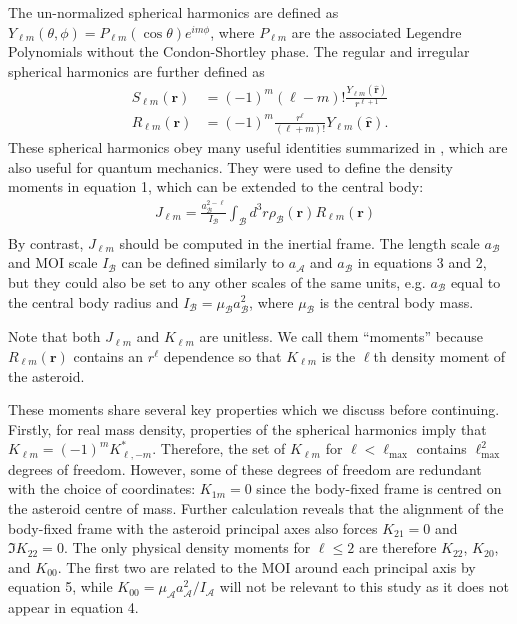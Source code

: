 \documentclass[9pt,twocolumn]{article}
\newcommand{\unit}[1]{\bm{\hat{#1}}}
\numberwithin{equation}{section}
\begin{document}
The un-normalized spherical harmonics are defined as $Y_{\ell m}(\theta, \phi) = P_{\ell m}(\cos \theta)e^{im\phi}$, where $P_{\ell m}$ are the associated Legendre Polynomials without the Condon-Shortley phase. The regular and irregular spherical harmonics are further defined as
\begin{equation}
  \begin{split}
    S_{\ell m}(\bm r) &= (-1)^m (\ell - m)! \frac{Y_{\ell m}(\unit r)}{r^{\ell+1}} \\
    R_{\ell m} (\bm r) &= (-1)^m \frac{r^\ell}{(\ell + m)!} Y_{\ell m}(\unit r).
  \end{split}
\end{equation}
These spherical harmonics obey many useful identities summarized in \cite{Gelderen1998TheSO}, which are also useful for quantum mechanics. They were used to define the density moments in equation 1, which can be extended to the central body:
\begin{equation}
  \begin{split}
    &J_{\ell m} = \frac{a_\mathcal{B}^{2-\ell}}{I_\mathcal{B}} \int_\mathcal{B} d^3 r \rho_\mathcal{B}(\bm r) R_{\ell m}(\bm r)\\
  \end{split}
  \label{eqn:jlm}
\end{equation}
By contrast, $J_{\ell m}$ should be computed in the inertial frame. The length scale $a_\mathcal{B}$ and MOI scale $I_\mathcal{B}$ can be defined similarly to $a_\mathcal{A}$ and $a_\mathcal{B}$ in equations 3 and 2, but they could also be set to any other scales of the same units, e.g. $a_\mathcal{B}$ equal to the central body radius and $I_\mathcal{B} = \mu_\mathcal{B}a_\mathcal{B}^2$, where $\mu_\mathcal{B}$ is the central body mass.

Note that both $J_{\ell m}$ and $K_{\ell m}$ are unitless. We call them ``moments'' because $R_{\ell m}(\bm r)$ contains an $r^\ell$ dependence so that $K_{\ell m}$ is the $\ell$th density moment of the asteroid.

These moments share several key properties which we discuss before continuing. Firstly, for real mass density, properties of the spherical harmonics imply that $K_{\ell m} = (-1)^m K_{\ell, -m}^*$. Therefore, the set of $K_{\ell m}$ for $\ell < \ell_\text{max}$ contains $\ell_\text{max}^2$ degrees of freedom. However, some of these degrees of freedom are redundant with the choice of coordinates: $K_{1m} = 0$ since the body-fixed frame is centred on the asteroid centre of mass. Further calculation reveals that the alignment of the body-fixed frame with the asteroid principal axes also forces $K_{21}= 0$ and $\Im K_{22}=0$. The only physical density moments for $\ell \leq 2$ are therefore $K_{22}$, $K_{20}$, and $K_{00}$. The first two are related to the MOI around each principal axis by equation 5, while $K_{00} = \mu_\mathcal{A} a_\mathcal{A}^2 / I_\mathcal{A}$ will not be relevant to this study as it does not appear in equation 4. 
\end{document}
